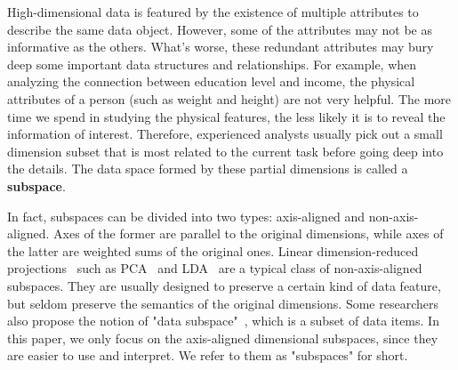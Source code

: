 \maketitle
\label{sec:introduction}

High-dimensional data is featured by the existence of multiple attributes to describe the same data object. However, some of the attributes may not be as informative as the others. What's worse, these redundant attributes may bury deep some important data structures and relationships. For example, when analyzing the connection between education level and income, the physical attributes of a person (such as weight and height) are not very helpful. The more time we spend in studying the physical features, the less likely it is to reveal the information of interest. Therefore, experienced analysts usually pick out a small dimension subset that is most related to the current task before going deep into the details. The data space formed by these partial dimensions is called a \textbf{subspace}.

In fact, subspaces can be divided into two types: axis-aligned and non-axis-aligned. Axes of the former are parallel to the original dimensions, while axes of the latter are weighted sums of the original ones. Linear dimension-reduced projections~\cite{fodor2002survey} such as PCA~\cite{wold1987principal} and LDA~\cite{mika1999fisher} are a typical class of non-axis-aligned subspaces. They are usually designed to preserve a certain kind of data feature, but seldom preserve the semantics of the original dimensions. Some researchers also propose the notion of "data subspace"~\cite{DBLP:journals/tvcg/YuanRWG13}, which is a subset of data items. In this paper, we only focus on the axis-aligned dimensional subspaces, since they are easier to use and interpret. We refer to them as "subspaces" for short.

